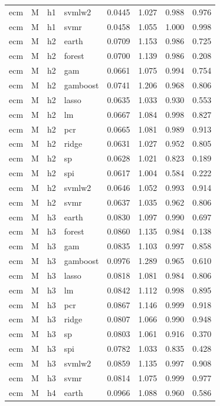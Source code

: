 \begin{ThreePartTable}
\begin{longtable}[t]{llclcccc}
ecm & M & h1 & svmlw2 & 0.0445 & 1.027 & 0.988 & 0.976\\
ecm & M & h1 & svmr & 0.0458 & 1.055 & 1.000 & 0.998\\
\addlinespace
ecm & M & h2 & earth & 0.0709 & 1.153 & 0.986 & 0.725\\
ecm & M & h2 & forest & 0.0700 & 1.139 & 0.986 & 0.208\\
ecm & M & h2 & gam & 0.0661 & 1.075 & 0.994 & 0.754\\
ecm & M & h2 & gamboost & 0.0741 & 1.206 & 0.968 & 0.806\\
ecm & M & h2 & lasso & 0.0635 & 1.033 & 0.930 & 0.553\\
ecm & M & h2 & lm & 0.0667 & 1.084 & 0.998 & 0.827\\
ecm & M & h2 & pcr & 0.0665 & 1.081 & 0.989 & 0.913\\
ecm & M & h2 & ridge & 0.0631 & 1.027 & 0.952 & 0.805\\
ecm & M & h2 & sp & 0.0628 & 1.021 & 0.823 & 0.189\\
ecm & M & h2 & spi & 0.0617 & 1.004 & 0.584 & 0.222\\
ecm & M & h2 & svmlw2 & 0.0646 & 1.052 & 0.993 & 0.914\\
ecm & M & h2 & svmr & 0.0637 & 1.035 & 0.962 & 0.806\\
\addlinespace
ecm & M & h3 & earth & 0.0830 & 1.097 & 0.990 & 0.697\\
ecm & M & h3 & forest & 0.0860 & 1.135 & 0.984 & 0.138\\
ecm & M & h3 & gam & 0.0835 & 1.103 & 0.997 & 0.858\\
ecm & M & h3 & gamboost & 0.0976 & 1.289 & 0.965 & 0.610\\
ecm & M & h3 & lasso & 0.0818 & 1.081 & 0.984 & 0.806\\
ecm & M & h3 & lm & 0.0842 & 1.112 & 0.998 & 0.895\\
ecm & M & h3 & pcr & 0.0867 & 1.146 & 0.999 & 0.918\\
ecm & M & h3 & ridge & 0.0807 & 1.066 & 0.990 & 0.948\\
ecm & M & h3 & sp & 0.0803 & 1.061 & 0.916 & 0.370\\
ecm & M & h3 & spi & 0.0782 & 1.033 & 0.835 & 0.428\\
ecm & M & h3 & svmlw2 & 0.0859 & 1.135 & 0.997 & 0.908\\
ecm & M & h3 & svmr & 0.0814 & 1.075 & 0.999 & 0.977\\
\addlinespace
ecm & M & h4 & earth & 0.0966 & 1.088 & 0.960 & 0.586\\

\end{longtable}
\end{ThreePartTable}
